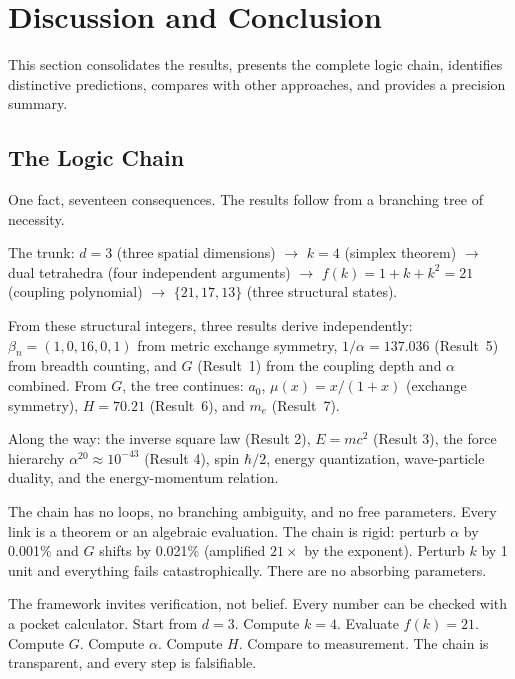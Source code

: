 \documentclass[aps,prd,preprint,superscriptaddress,showpacs,preprintnumbers,amsmath,amssymb,nofootinbib]{revtex4-2}
\begin{document}
\section{Discussion and Conclusion}
\label{sec:conclusion}

This section consolidates the results, presents the complete logic chain, identifies distinctive predictions, compares with other approaches, and provides a precision summary.

\subsection{The Logic Chain}
\label{subsec:chain}

One fact, seventeen consequences. The results follow from a branching tree of necessity.

The trunk: $d = 3$ (three spatial dimensions) $\to$ $k = 4$ (simplex theorem) $\to$ dual tetrahedra (four independent arguments) $\to$ $f(k) = 1 + k + k^2 = 21$ (coupling polynomial) $\to$ $\{21, 17, 13\}$ (three structural states).

From these structural integers, three results derive independently: $\beta_n = (1, 0, 16, 0, 1)$ from metric exchange symmetry, $1/\alpha = 137.036$ (Result~5) from breadth counting, and $G$ (Result~1) from the coupling depth and $\alpha$ combined. From $G$, the tree continues: $a_0$, $\mu(x) = x/(1+x)$ (exchange symmetry), $H = 70.21$ (Result~6), and $m_e$ (Result~7).

Along the way: the inverse square law (Result 2), $E = mc^2$ (Result 3), the force hierarchy $\alpha^{20} \approx 10^{-43}$ (Result 4), spin $\hbar/2$, energy quantization, wave-particle duality, and the energy-momentum relation.

The chain has no loops, no branching ambiguity, and no free parameters. Every link is a theorem or an algebraic evaluation. The chain is rigid: perturb $\alpha$ by 0.001\% and $G$ shifts by 0.021\% (amplified $21\times$ by the exponent). Perturb $k$ by 1 unit and everything fails catastrophically. There are no absorbing parameters.

The framework invites verification, not belief. Every number can be checked with a pocket calculator. Start from $d = 3$. Compute $k = 4$. Evaluate $f(k) = 21$. Compute $G$. Compute $\alpha$. Compute $H$. Compare to measurement. The chain is transparent, and every step is falsifiable.
\end{document}
